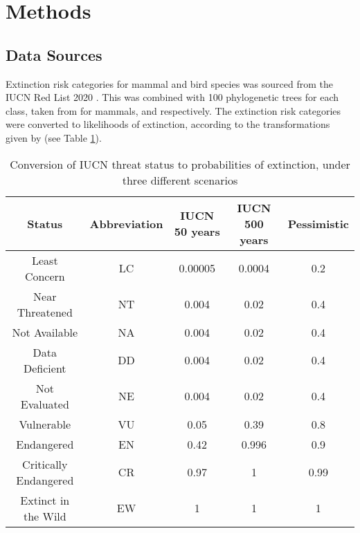 \documentclass[12pt]{article}
\begin{document}
	
	
	
	\section{Methods}
	\subsection{Data Sources}
	Extinction risk categories for mammal and bird species was sourced from the IUCN Red List 2020 \citep{iucnIUCNRedList2021, iucnIUCNRedList2012}. This was combined with 100 phylogenetic trees for each class, taken from \citet{uphamInferringMammalTree2019}
	for mammals, and \citet{jetzGlobalDiversityBirds2012} respectively.
	 The extinction risk categories were converted to likelihoods of extinction, according to the transformations given by \citep{mooersConvertingEndangeredSpecies2008} (see Table \ref{ext_prob}).
	
	\begin{table}[b]
		\begin{tabular}{|c|c c c c|}
			\hline
			Status & Abbreviation & IUCN 50 years & IUCN 500 years & Pessimistic \\
			\hline
			Least Concern & LC & 0.00005 & 0.0004 & 0.2 \\
			Near Threatened & NT & 0.004 & 0.02 & 0.4 \\
			Not Available & NA & 0.004 & 0.02 & 0.4 \\
			Data Deficient & DD & 0.004 & 0.02 & 0.4 \\
			Not Evaluated & NE & 0.004 & 0.02 & 0.4 \\
			Vulnerable & VU & 0.05 & 0.39 & 0.8 \\
			Endangered & EN & 0.42 & 0.996 & 0.9 \\
			Critically Endangered & CR & 0.97 & 1 & 0.99 \\
			Extinct in the Wild & EW & 1 & 1 & 1 \\
			\hline
		\end{tabular}
		\caption{Conversion of IUCN threat status to probabilities of extinction, under three
			different scenarios \citep{mooersConvertingEndangeredSpecies2008}}\label{ext_prob}
	\end{table}
\end{document}
